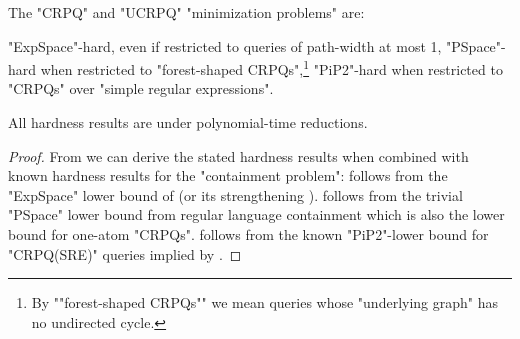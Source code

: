 \begin{corollary}
	\AP\label{coro:lowerbounds}
	The "CRPQ" and "UCRPQ" "minimization problems" are:
	\begin{enumerate}
		\itemAP\label{expspace-h:pw1}"ExpSpace"-hard, even
		if restricted to queries of path-width at most 1,
		\itemAP\label{pspace:forest} "PSpace"-hard when restricted to "forest-shaped CRPQs",\footnote{By \AP""forest-shaped CRPQs"" we mean queries whose "underlying graph" has no undirected cycle.}
		\itemAP\label{pip2:crpqsre} "PiP2"-hard when restricted to "CRPQs" over "simple regular expressions".
	\end{enumerate}
	All hardness results are under polynomial-time reductions.
\end{corollary}

\begin{proof}
	From  we can derive the stated hardness results when combined with known hardness results for the "containment problem":
	 follows from the "ExpSpace" lower bound of \cite[Lemma 8]{Figueira2020Containment} (or its strengthening ).
%
	 follows from the trivial "PSpace" lower bound from regular language containment which is also the lower bound for one-atom "CRPQs".
%
	 follows from the known "PiP2"-lower bound for "CRPQ(SRE)" queries implied by \cite[Theorem 4.2]{FigueiraEtal2020Containment}.
\end{proof}